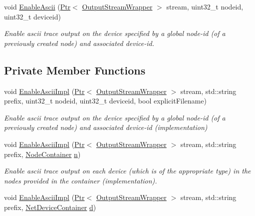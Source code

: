 \begin{DoxyCompactItemize}
void \hyperlink{classns3_1_1AsciiTraceHelperForDevice_a0c63ff1e2175687bbd3aa01576dcc87f}{Enable\+Ascii} (\hyperlink{classns3_1_1Ptr}{Ptr}$<$ \hyperlink{classns3_1_1OutputStreamWrapper}{Output\+Stream\+Wrapper} $>$ stream, uint32\+\_\+t nodeid, uint32\+\_\+t deviceid)
\begin{DoxyCompactList}\small\item\em Enable ascii trace output on the device specified by a global node-\/id (of a previously created node) and associated device-\/id. \end{DoxyCompactList}\end{DoxyCompactItemize}
\subsection*{Private Member Functions}
\begin{DoxyCompactItemize}
\item 
void \hyperlink{classns3_1_1AsciiTraceHelperForDevice_a079409672a10e1316916c2a277424dcc}{Enable\+Ascii\+Impl} (\hyperlink{classns3_1_1Ptr}{Ptr}$<$ \hyperlink{classns3_1_1OutputStreamWrapper}{Output\+Stream\+Wrapper} $>$ stream, std\+::string prefix, uint32\+\_\+t nodeid, uint32\+\_\+t deviceid, bool explicit\+Filename)
\begin{DoxyCompactList}\small\item\em Enable ascii trace output on the device specified by a global node-\/id (of a previously created node) and associated device-\/id (implementation) \end{DoxyCompactList}\item 
void \hyperlink{classns3_1_1AsciiTraceHelperForDevice_a704ffba0d6a860fe0d3b297f572a84f3}{Enable\+Ascii\+Impl} (\hyperlink{classns3_1_1Ptr}{Ptr}$<$ \hyperlink{classns3_1_1OutputStreamWrapper}{Output\+Stream\+Wrapper} $>$ stream, std\+::string prefix, \hyperlink{classns3_1_1NodeContainer}{Node\+Container} \hyperlink{lte__link__budget__x2__handover__measures_8m_abdb05bc5a064cf642a06c83b3392f148}{n})
\begin{DoxyCompactList}\small\item\em Enable ascii trace output on each device (which is of the appropriate type) in the nodes provided in the container (implementation). \end{DoxyCompactList}\item 
void \hyperlink{classns3_1_1AsciiTraceHelperForDevice_a4f7a3843f748e35fa582a8a6f22a9114}{Enable\+Ascii\+Impl} (\hyperlink{classns3_1_1Ptr}{Ptr}$<$ \hyperlink{classns3_1_1OutputStreamWrapper}{Output\+Stream\+Wrapper} $>$ stream, std\+::string prefix, \hyperlink{classns3_1_1NetDeviceContainer}{Net\+Device\+Container} \hyperlink{lte__pathloss_8m_a1aabac6d068eef6a7bad3fdf50a05cc8}{d})

\end{DoxyCompactItemize}
